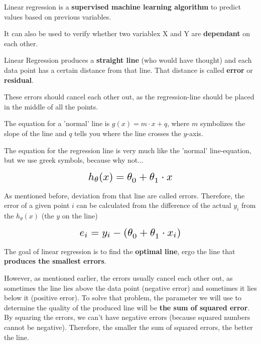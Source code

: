 \documentclass[a4paper, 11pt]{article}
\begin{document}
Linear regression is a \textbf{supervised machine learning algorithm} to predict values based on previous variables.

It can also be used to verify whether two variablex X and Y are \textbf{dependant} on each other.

\vspace{10px}

Linear Regression produces a \textbf{straight line} (who would have thought) and each data point has a certain distance from that line. That distance is called \textbf{error} or \textbf{residual}. 

These errors should cancel each other out, as the regression-line should be placed in the middle of all the points.

\vspace{10px}

The equation for a 'normal' line is $g(x) = m \cdot x + q$, where $m$ symbolizes the slope of the line and $q$ tells you where the line crosses the $y$-axis.

The equation for the regression line is very much like the 'normal' line-equation, but we use greek symbols, because why not...

\[\scalebox{1.5}{
        $h_{\theta}(x) = \theta^{}_{0} + \theta^{}_{1} \cdot x$
}\]

\vspace{10px}

As mentioned before, deviation from that line are called errors. Therefore, the error of a given point $i$ can be calculated from the difference of the actual $y_{i}$ from the $h_{\theta}(x)$ (the $y$ on the line)

\[\scalebox{1.5}{
        $e_{i} = y_{i} - (\theta^{}_{0} + \theta^{}_{1} \cdot x_{i})$
}\]

\vspace{10px}

The goal of linear regression is to find the \textbf{optimal line}, ergo the line that \textbf{produces the smallest errors}.

However, as mentioned earlier, the errors usually cancel each other out, as sometimes the line lies above the data point (negative error) and sometimes it lies below it (positive error). To solve that problem, the parameter we will use to determine the quality of the produced line will be \textbf{the sum of squared error}. By squaring the errors, we can't have negative errors (because squared numbers cannot be negative). Therefore, the smaller the sum of squared errors, the better the line.
\end{document}

